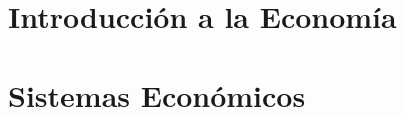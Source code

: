\documentclass[12pt, a4paper, twoside]{book}
\begin{document}



\chapter{Introducción a la Economía}

% 
% 
% 

% 
% 
% 

% 
% 
% 

% 
% 
% 

% 
% 
% 

% 
% 
% 

% 
% 
% 

\chapter{Sistemas Económicos}

% 
% 
% 

% 
% 
% 

% 
% 
% 
\end{document}
